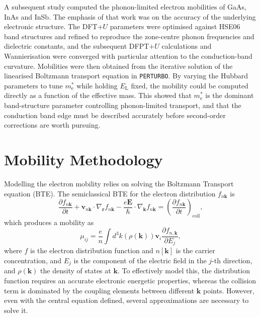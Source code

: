 \documentclass[aps,prmaterials,reprint,amsmath,amssymb,superscriptaddress]{revtex4-2}
\begin{document}
A subsequent study\cite{Dehghani2026} computed the phonon-limited electron mobilities of GaAs, InAs and InSb. The emphasis of that work was on the accuracy of the underlying electronic structure. The DFT$+U$ parameters were optimised against HSE06\cite{hse06} band structures and refined to reproduce the zone-centre phonon frequencies and dielectric constants, and the subsequent DFPT$+U$ calculations and Wannierisation\cite{w901_Mostofi2008,w903_Pizzi2020} were converged with particular attention to the conduction-band curvature. Mobilities were then obtained from the iterative solution of the linearised Boltzmann transport equation in \texttt{PERTURBO}\cite{Perturbo1}. By varying the Hubbard parameters to tune $m^*_\text{e}$ while holding $E_\text{L}$ fixed, the mobility could be computed directly as a function of the effective mass. This showed that $m^*_\text{e}$ is the dominant band-structure parameter controlling phonon-limited transport, and that the conduction band edge must be described accurately before second-order corrections are worth
pursuing.

\section{Mobility Methodology}\label{sec:methodology}

Modelling the electron mobility relies on solving the Boltzmann Transport equation (BTE). The semiclassical BTE for the electron distribution $f_{n\bm{k}}$ is
\begin{equation}
    \frac{\partial f_{n\bm{k}}}{\partial t}
    +\bm{v}_{n\bm{k}}\cdot\nabla_{\bm{r}} f_{n\bm{k}}
    -\frac{e\bm{E}}{\hbar}\cdot\nabla_{\bm{k}} f_{n\bm{k}}
    =\left(\frac{\partial f_{n\bm{k}}}{\partial t}\right)_\text{coll},
    \label{eq:BTE}
\end{equation}
which produces a mobility as 
\begin{equation}
    \mu_{ij} = \frac{e}{n} \int d^{3}k (\rho(\bm{k})) \bm{v}_i \frac{\partial f_{n,\bm{k}}}{\partial E_j},
\end{equation}
where $f$ is the electron distribution function and $n[\bm{k}]$ is the carrier concentration, and $E_j$ is the component of the electric field in the $j$-th direction, and $\rho(\bm{k})$ the density of states at $\bm{k}$. To effectively model this, the distribution function requires an accurate electronic energetic properties, whereas the collision term is dominated by the coupling elements between different $\bm{k}$ points. However, even with the central equation defined, several approximations are necessary to solve it. 
\end{document}
